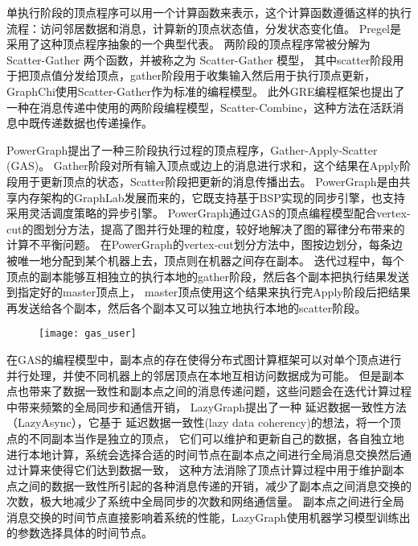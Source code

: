 单执行阶段的顶点程序可以用一个计算函数来表示，这个计算函数遵循这样的执行流程：访问邻居数据和消息，计算新的顶点状态值，分发状态变化值。
Pregel是采用了这种顶点程序抽象的一个典型代表。
两阶段的顶点程序常被分解为 Scatter-Gather 两个函数，并被称之为 Scatter-Gather 模型，
其中scatter阶段用于把顶点值分发给顶点，gather阶段用于收集输入然后用于执行顶点更新，
GraphChi\cite{GraphChi}使用Scatter-Gather作为标准的编程模型。
此外GRE\cite{GRE}编程框架也提出了一种在消息传递中使用的两阶段编程模型，Scatter-Combine，这种方法在活跃消息中既传递数据也传递操作。

PowerGraph\cite{Gonzalez@OSDI12}提出了一种三阶段执行过程的顶点程序，Gather-Apply-Scatter (GAS)。
Gather阶段对所有输入顶点或边上的消息进行求和，这个结果在Apply阶段用于更新顶点的状态，Scatter阶段把更新的消息传播出去。
PowerGraph是由共享内存架构的GraphLab\cite{Low@12}发展而来的，它既支持基于BSP实现的同步引擎，也支持采用灵活调度策略的异步引擎。
PowerGraph通过GAS的顶点编程模型配合vertex-cut的图划分方法，提高了图并行处理的粒度，较好地解决了图的幂律分布带来的计算不平衡问题。
在PowerGraph的vertex-cut划分方法中，图按边划分，每条边被唯一地分配到某个机器上去，顶点则在机器之间存在副本。
迭代过程中，每个顶点的副本能够互相独立的执行本地的gather阶段，然后各个副本把执行结果发送到指定好的master顶点上，
master顶点使用这个结果来执行完Apply阶段后把结果再发送给各个副本，然后各个副本又可以独立地执行本地的scatter阶段。


\begin{figure}[!htbp]
\centering
\texttt{[image: gas\_user]}
\end{figure}

在GAS的编程模型中，副本点的存在使得分布式图计算框架可以对单个顶点进行并行处理，并使不同机器上的邻居顶点在本地互相访问数据成为可能。
但是副本点也带来了数据一致性和副本点之间的消息传递问题，这些问题会在迭代计算过程中带来频繁的全局同步和通信开销，
LazyGraph\cite{Wang@PPoPP18}提出了一种 延迟数据一致性方法（LazyAsync），它基于
延迟数据一致性(lazy data coherency)的想法，将一个顶点的不同副本当作是独立的顶点，
它们可以维护和更新自己的数据，各自独立地进行本地计算，系统会选择合适的时间节点在副本点之间进行全局消息交换然后通过计算来使得它们达到数据一致，
这种方法消除了顶点计算过程中用于维护副本点之间的数据一致性所引起的各种消息传递的开销，减少了副本点之间消息交换的次数，极大地减少了系统中全局同步的次数和网络通信量。
副本点之间进行全局消息交换的时间节点直接影响着系统的性能，LazyGraph使用机器学习模型训练出的参数选择具体的时间节点。


